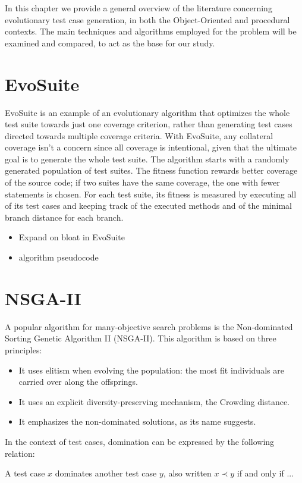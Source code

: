 In this chapter we provide a general overview of the literature  concerning evolutionary test case generation, in both the Object-Oriented and procedural contexts. 
The main techniques and algorithms employed for the problem will be examined and compared, to act as the base for our study.


\section{EvoSuite}
EvoSuite is an example of an evolutionary algorithm that optimizes the whole test suite towards just one coverage criterion, rather than generating test cases directed towards multiple coverage criteria.
With EvoSuite, any collateral coverage isn't a concern since all coverage is intentional, given that the ultimate goal is to generate the whole test suite.
The algorithm starts with a randomly generated population of test suites.
The fitness function rewards better coverage of the source code; if two suites have the same coverage, the one with fewer statements is chosen. For each test suite, its fitness is measured by executing all of its test cases and keeping track of the executed methods and of the minimal branch distance for each branch.

\begin{itemize}
    \item Expand on bloat in EvoSuite
    \item algorithm pseudocode
\end{itemize}




\newpage
\section{NSGA-II}
A popular algorithm for many-objective search problems is the Non-dominated Sorting Genetic Algorithm II (NSGA-II). This algorithm is based on three principles:

\begin{itemize}
    \item It uses elitism when evolving the population: the most fit individuals are carried over along the offsprings.
    \item It uses an explicit diversity-preserving mechanism, the Crowding distance.
    \item It emphasizes the non-dominated solutions, as its name suggests.
\end{itemize}

In the context of test cases, domination can be expressed by the following relation:
\begin{definition}
    A test case $ x $ dominates another test case $ y $, also written $ x  \prec y $ if and only if ...
\end{definition}

